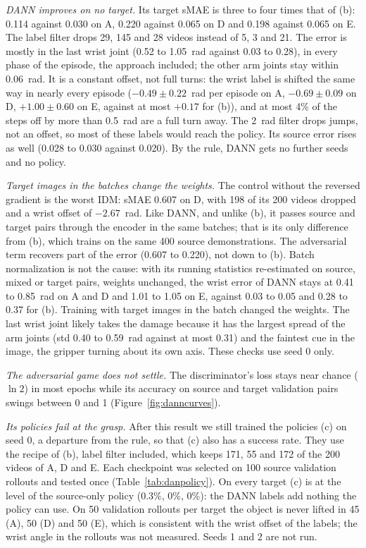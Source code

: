 \documentclass{article}
\begin{document}
\emph{DANN improves on no target.} Its target sMAE is three to four times that of (b):
0.114 against 0.030 on A, 0.220 against 0.065 on D and 0.198 against 0.065 on E. The label
filter drops 29, 145 and 28 videos instead of 5, 3 and 21. The error is mostly in the last
wrist joint (0.52 to 1.05~rad against 0.03 to 0.28), in every phase of the episode, the
approach included; the other arm joints stay within 0.06~rad. It is a constant offset,
not full turns: the wrist label is shifted the same way in nearly every episode
($-0.49 \pm 0.22$~rad per episode on A, $-0.69 \pm 0.09$ on D, $+1.00 \pm 0.60$ on E,
against at most $+0.17$ for (b)), and at most 4\% of the steps off by more than 0.5~rad are
a full turn away. The 2~rad filter drops jumps, not an offset, so most of these labels
would reach the policy. Its source error rises as
well (0.028 to 0.030 against 0.020). By the rule, DANN gets no further seeds and no policy.

\emph{Target images in the batches change the weights.} The control without the reversed
gradient is the worst IDM: sMAE 0.607 on D, with 198 of its 200 videos dropped and a wrist
offset of $-2.67$~rad. Like DANN, and unlike (b), it passes source and target pairs through
the encoder in the same batches; that is its only difference from (b), which trains on the
same 400 source demonstrations. The adversarial term recovers part of the error (0.607 to
0.220), not down to (b). Batch normalization is not the cause: with its running statistics
re-estimated on source, mixed or target pairs, weights unchanged, the wrist error of DANN
stays at 0.41 to 0.85~rad on A and D and 1.01 to 1.05 on E, against 0.03 to 0.05 and 0.28
to 0.37 for (b). Training with target images in the batch changed the weights. The last
wrist joint likely takes the damage because it has the largest spread of the arm joints
(std 0.40 to 0.59~rad against at most 0.31) and the faintest cue in the image, the gripper
turning about its own axis. These checks use seed 0 only.

\emph{The adversarial game does not settle.} The discriminator's loss stays near chance
($\ln 2$) in most epochs while its accuracy on source and target validation pairs swings
between 0 and 1 (Figure~\ref{fig:danncurves}).

\emph{Its policies fail at the grasp.} After this result we still trained the policies (c)
on seed 0, a departure from the rule, so that (c) also has a success rate. They use the
recipe of (b), label filter included, which keeps 171, 55 and 172 of the 200 videos of A,
D and E. Each checkpoint was selected on 100 source validation rollouts and tested once
(Table~\ref{tab:danpolicy}). On every target (c) is at the level of the source-only
policy (0.3\%, 0\%, 0\%): the DANN labels add nothing the policy can use. On 50
validation rollouts per target the object is never lifted in 45 (A), 50 (D) and 50 (E),
which is consistent with the wrist offset of the labels; the wrist angle in the rollouts
was not measured. Seeds 1 and 2 are not run.
\end{document}

